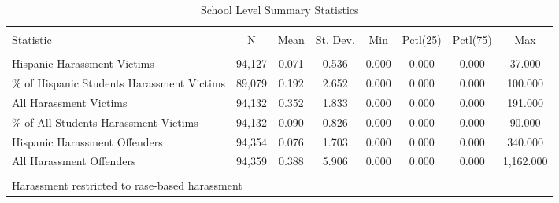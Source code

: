
\begin{table}[!htbp] \centering 
  \caption{School Level Summary Statistics} 
  \label{} 
\begin{tabular}{@{\extracolsep{5pt}}lccccccc} 
\\[-1.8ex]\hline 
\hline \\[-1.8ex] 
Statistic & \multicolumn{1}{c}{N} & \multicolumn{1}{c}{Mean} & \multicolumn{1}{c}{St. Dev.} & \multicolumn{1}{c}{Min} & \multicolumn{1}{c}{Pctl(25)} & \multicolumn{1}{c}{Pctl(75)} & \multicolumn{1}{c}{Max} \\ 
\hline \\[-1.8ex] 
Hispanic Harassment Victims & 94,127 & 0.071 & 0.536 & 0.000 & 0.000 & 0.000 & 37.000 \\ 
\% of Hispanic Students Harassment Victims & 89,079 & 0.192 & 2.652 & 0.000 & 0.000 & 0.000 & 100.000 \\ 
All Harassment Victims & 94,132 & 0.352 & 1.833 & 0.000 & 0.000 & 0.000 & 191.000 \\ 
\% of All Students Harassment Victims & 94,132 & 0.090 & 0.826 & 0.000 & 0.000 & 0.000 & 90.000 \\ 
Hispanic Harassment Offenders & 94,354 & 0.076 & 1.703 & 0.000 & 0.000 & 0.000 & 340.000 \\ 
All Harassment Offenders & 94,359 & 0.388 & 5.906 & 0.000 & 0.000 & 0.000 & 1,162.000 \\ 
\hline \\[-1.8ex] 
\multicolumn{8}{l}{Harassment restricted to rase-based harassment} \\ 
\end{tabular} 
\end{table} 
